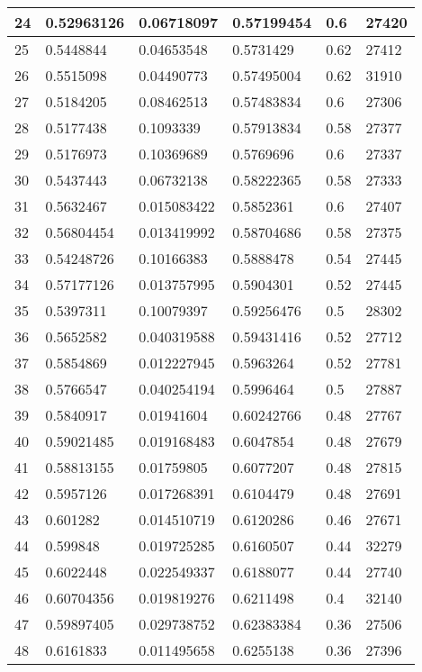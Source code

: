 \begin{longtable}{|l|l|l|l|l|l|}
24 & 0.52963126 & 0.06718097 & 0.57199454 & 0.6 & 27420 \\ \hline 
25 & 0.5448844 & 0.04653548 & 0.5731429 & 0.62 & 27412 \\ \hline 
26 & 0.5515098 & 0.04490773 & 0.57495004 & 0.62 & 31910 \\ \hline 
27 & 0.5184205 & 0.08462513 & 0.57483834 & 0.6 & 27306 \\ \hline 
28 & 0.5177438 & 0.1093339 & 0.57913834 & 0.58 & 27377 \\ \hline 
29 & 0.5176973 & 0.10369689 & 0.5769696 & 0.6 & 27337 \\ \hline 
30 & 0.5437443 & 0.06732138 & 0.58222365 & 0.58 & 27333 \\ \hline 
31 & 0.5632467 & 0.015083422 & 0.5852361 & 0.6 & 27407 \\ \hline 
32 & 0.56804454 & 0.013419992 & 0.58704686 & 0.58 & 27375 \\ \hline 
33 & 0.54248726 & 0.10166383 & 0.5888478 & 0.54 & 27445 \\ \hline 
34 & 0.57177126 & 0.013757995 & 0.5904301 & 0.52 & 27445 \\ \hline 
35 & 0.5397311 & 0.10079397 & 0.59256476 & 0.5 & 28302 \\ \hline 
36 & 0.5652582 & 0.040319588 & 0.59431416 & 0.52 & 27712 \\ \hline 
37 & 0.5854869 & 0.012227945 & 0.5963264 & 0.52 & 27781 \\ \hline 
38 & 0.5766547 & 0.040254194 & 0.5996464 & 0.5 & 27887 \\ \hline 
39 & 0.5840917 & 0.01941604 & 0.60242766 & 0.48 & 27767 \\ \hline 
40 & 0.59021485 & 0.019168483 & 0.6047854 & 0.48 & 27679 \\ \hline 
41 & 0.58813155 & 0.01759805 & 0.6077207 & 0.48 & 27815 \\ \hline 
42 & 0.5957126 & 0.017268391 & 0.6104479 & 0.48 & 27691 \\ \hline 
43 & 0.601282 & 0.014510719 & 0.6120286 & 0.46 & 27671 \\ \hline 
44 & 0.599848 & 0.019725285 & 0.6160507 & 0.44 & 32279 \\ \hline 
45 & 0.6022448 & 0.022549337 & 0.6188077 & 0.44 & 27740 \\ \hline 
46 & 0.60704356 & 0.019819276 & 0.6211498 & 0.4 & 32140 \\ \hline 
47 & 0.59897405 & 0.029738752 & 0.62383384 & 0.36 & 27506 \\ \hline 
48 & 0.6161833 & 0.011495658 & 0.6255138 & 0.36 & 27396 \\ \hline 

\end{longtable}
